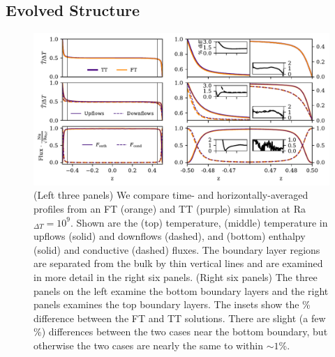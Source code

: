 \documentclass[aps, pre, onecolumn, nofootinbib, notitlepage, groupedaddress, amsfonts, amssymb, amsmath, longbibliography, superscriptaddress]{revtex4-1}
\begin{document}
\subsection{Evolved Structure}
\vspace{-0.5cm}
\begin{figure}
\includegraphics[width=\textwidth]{./figs/rbc_1D_profiles.pdf}
\caption{ 
	(Left three panels) We compare time- and horizontally-averaged profiles from an FT (orange) and TT (purple) simulation at Ra$_{\Delta T} = 10^{9}$.
	Shown are the (top) temperature, (middle) temperature in upflows (solid) and downflows (dashed), and (bottom) enthalpy (solid) and conductive (dashed) fluxes.
	The boundary layer regions are separated from the bulk by thin vertical lines and are examined in more detail in the right six panels.
	(Right six panels) The three panels on the left examine the bottom boundary layers and the right panels examines the top boundary layers.
	The insets show the \% difference between the FT and TT solutions.
	There are slight (a few \%) differences between the two cases near the bottom boundary, but otherwise the two cases are nearly the same to within $\sim 1$\%.
\label{fig:rbc_1D_profiles} }
\vspace{0.5cm}
\end{figure}
\end{document}
